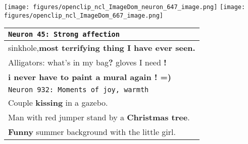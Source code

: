 \begin{minipage}{0.5\textwidth}
\texttt{[image: figures/openclip\_ncl\_ImageDom\_neuron\_647\_image.png]}
\texttt{[image: figures/openclip\_ncl\_ImageDom\_667\_image.png]}
\label{fig:act_imgs_imgD}
\end{minipage}
\begin{minipage}{0.48\textwidth}
    \centering
\footnotesize
\begin{tabular}{l}
\toprule[1pt]
\texttt{Neuron 45: Strong affection}\\
\midrule
sinkhole,\textbf{most terrifying thing I have ever seen.}  \\
Alligators: what's in my bag\textbf{?} gloves I need \textbf{!} \\
\textbf{i never have to paint a mural again ! =)} \\
\midrule
\texttt{Neuron 932: Moments of joy, warmth} \\
\midrule
Couple \textbf{kissing} in a gazebo.\\
Man with red jumper stand by a \textbf{Christmas tree}.\\
\textbf{Funny} summer background with the little girl. \\
\bottomrule[1pt]
    \end{tabular}
    \label{tab:act_sents_textd}
\end{minipage}



